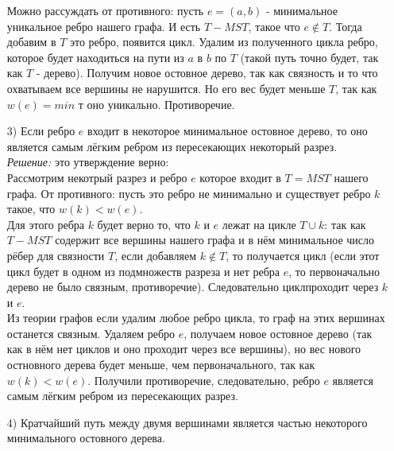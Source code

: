 \documentclass[a4paper,12pt]{article} %
\begin{document}
\begin{itemize}
Можно рассуждать от противного: пусть $ e = (a,b) $ - минимальное уникальное ребро нашего графа. И есть $ T - MST $, такое что $ e \notin T $. Тогда добавим в $ T $ это ребро, появится цикл. Удалим из полученного цикла ребро, которое будет находиться на пути из $ a $ в $ b $ по $ T $ (такой путь точно будет, так как $ T $ - дерево). Получим новое остовное дерево, так как связность и то что охватываем все вершины не нарушится. Но его вес будет меньше $ T $, так как $ w(e) = min $ т оно уникально. Противоречие.

\item[3) ] Если ребро $e$ входит в некоторое минимальное остовное дерево, то оно является самым лёгким ребром из пересекающих некоторый разрез.\\

\textit{Решение:} это утверждение верно:\\
Рассмотрим некотрый разрез и ребро $ e $ которое входит в $T = MST $ нашего графа. От противного: пусть это ребро не минимально и существует ребро $ k $ такое, что $ w(k) < w(e) $.\\
Для этого ребра $ k $ будет верно то, что $ k $ и $ e $ лежат на цикле $ T\cup k $: так как $ T - MST $ содержит все вершины нашего графа и в нём минимальное число рёбер для связности $ T $, если добавляем $ k \notin T $, то получается цикл (если этот цикл будет в одном из подмножеств разреза и нет ребра $ e $, то первоначально дерево не было связным, противоречие). Следовательно циклпроходит через $ k $ и $ e $.\\
Из теории графов если удалим любое ребро цикла, то граф на этих вершинах останется связным. Удаляем ребро $ e $, получаем новое остовное дерево (так как в нём нет циклов и оно проходит через все вершины), но вес нового остновного дерева будет меньше, чем первоначального, так как $ w(k) < w(e) $. Получили противоречие, следовательно, ребро $ e $ является самым лёгким ребром из пересекающих разрез.

\item[4) ] Кратчайший путь между двумя вершинами является частью некоторого минимального остовного дерева.\\


\end{itemize}
\end{document}

